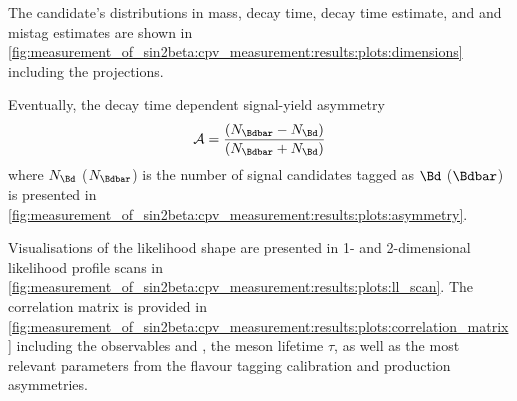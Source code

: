 The \Bmeson candidate's distributions in mass, decay time, decay time estimate, and \OS and
\SSpi mistag estimates are shown in
\cref{fig:measurement_of_sin2beta:cpv_measurement:results:plots:dimensions}
including the \PDF projections. 

Eventually, the decay time dependent signal-yield asymmetry
%
\begin{equation}
  \mathcal{A} = \frac{(N_{\Bdbar} - N_{\Bd})}{(N_{\Bdbar} + N_{\Bd})}
\end{equation}
%
where $N_{\Bd}$ ($N_{\Bdbar}$) is the number of \BdToJpsiKS signal candidates
tagged as $\Bd$ ($\Bdbar$) is presented in
\cref{fig:measurement_of_sin2beta:cpv_measurement:results:plots:asymmetry}.

Visualisations of the likelihood shape are presented in 1- and 2-dimensional
likelihood profile scans in
\cref{fig:measurement_of_sin2beta:cpv_measurement:results:plots:ll_scan}. 
The correlation matrix is provided in 
\cref{fig:measurement_of_sin2beta:cpv_measurement:results:plots:correlation_matrix} 
including the \CP observables \SJpsiKS and \CJpsiKS, the \Bd meson lifetime
$\tau$, as well as the most relevant parameters from the flavour tagging
calibration and production asymmetries.

